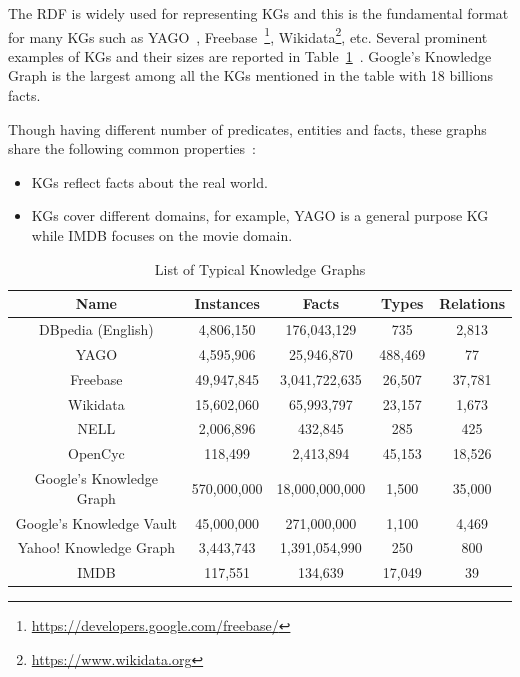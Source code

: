 The RDF is widely used for representing KGs and this is the fundamental format for many KGs such as YAGO~\cite{ref28}, Freebase~\footnote{\url{https://developers.google.com/freebase/}}, Wikidata\footnote{\url{https://www.wikidata.org}}, etc. Several prominent examples of KGs and their sizes are reported in Table~\ref{table1}~\cite{ref27}. Google's Knowledge Graph is the largest among all the KGs mentioned in the table with 18 billions facts.

Though having different number of predicates, entities and facts, these graphs share the following common properties~\cite{ref27}:

\begin{itemize}
\item KGs reflect facts about the real world.
\item KGs cover different domains, for example, YAGO is a general purpose KG while IMDB focuses on the movie domain.
\end{itemize}

\begin{table}
\begin{center}
\begin{tabular}{|c|c|c|c|c|}
\hline
Name & Instances & Facts & Types & Relations\\
\hline\hline
DBpedia (English) & 4,806,150 & 176,043,129 & 735 & 2,813\\
\hline
YAGO & 4,595,906 & 25,946,870 & 488,469 & 77\\
\hline
Freebase & 49,947,845 & 3,041,722,635 & 26,507 & 37,781\\
\hline
Wikidata & 15,602,060 & 65,993,797 & 23,157 & 1,673\\
\hline
NELL & 2,006,896 & 432,845 & 285 & 425\\
\hline
OpenCyc & 118,499 & 2,413,894 & 45,153 & 18,526\\
\hline
Google's Knowledge Graph & 570,000,000 & 18,000,000,000 & 1,500 & 35,000\\
\hline
Google's Knowledge Vault & 45,000,000 & 271,000,000 & 1,100 & 4,469\\
\hline
Yahoo! Knowledge Graph & 3,443,743 & 1,391,054,990 & 250 & 800\\
\hline
IMDB & 117,551 & 134,639 & 17,049 & 39 \\
\hline
\end{tabular}
\end{center}
\caption{List of Typical Knowledge Graphs}
\label{table1}
\end{table}

